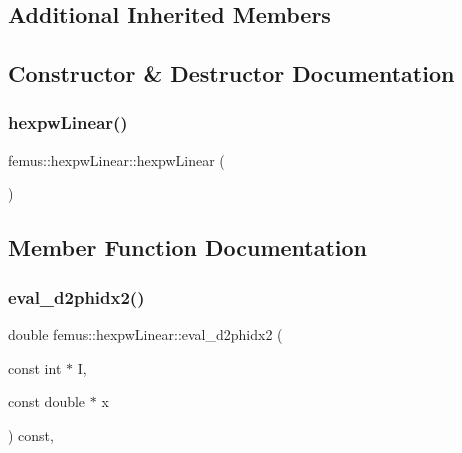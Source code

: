 \subsection*{Additional Inherited Members}


\subsection{Constructor \& Destructor Documentation}
\mbox{\label{classfemus_1_1hexpw_linear_a19059388df40fa2b1191830535c0cd5a}} 
\subsubsection{\texorpdfstring{hexpw\+Linear()}{hexpwLinear()}}
{\footnotesize\ttfamily femus\+::hexpw\+Linear\+::hexpw\+Linear (\begin{DoxyParamCaption}{ }\end{DoxyParamCaption})\hspace{0.3cm}{\ttfamily [inline]}}



\subsection{Member Function Documentation}
\mbox{\label{classfemus_1_1hexpw_linear_a08b0b6ced1587ddf865452d6039c5e0b}} 
\subsubsection{\texorpdfstring{eval\+\_\+d2phidx2()}{eval\_d2phidx2()}}
{\footnotesize\ttfamily double femus\+::hexpw\+Linear\+::eval\+\_\+d2phidx2 (\begin{DoxyParamCaption}\item[{const int $\ast$}]{I,  }\item[{const double $\ast$}]{x }\end{DoxyParamCaption}) const\hspace{0.3cm}{\ttfamily [inline]}, {\ttfamily [virtual]}}



